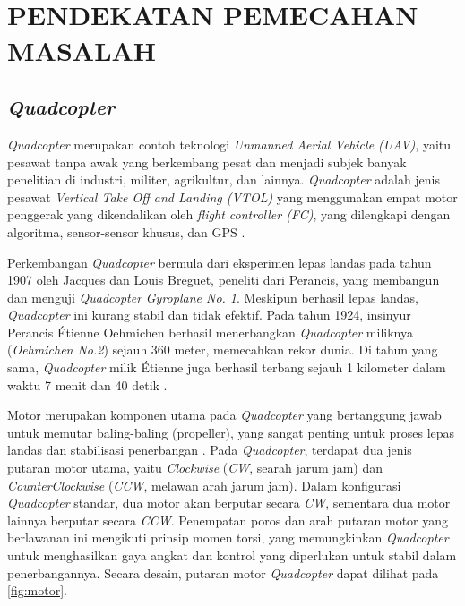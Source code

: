 
\chapter[PENDEKATAN PEMECAHAN MASALAH]{\\ PENDEKATAN PEMECAHAN MASALAH}

\section{\textit{Quadcopter}}

\textit{Quadcopter} merupakan contoh teknologi \textit{Unmanned Aerial Vehicle (UAV)}, yaitu pesawat tanpa awak yang berkembang pesat dan menjadi subjek banyak penelitian di industri, militer, agrikultur, dan lainnya. \textit{Quadcopter} adalah jenis pesawat \textit{Vertical Take Off and Landing (VTOL)} yang menggunakan empat motor penggerak yang dikendalikan oleh \textit{flight controller (FC)}, yang dilengkapi dengan algoritma, sensor-sensor khusus, dan GPS \citep{devianto2017sistem}. 

Perkembangan \textit{Quadcopter} bermula dari eksperimen lepas landas pada tahun 1907 oleh Jacques dan Louis Breguet, peneliti dari Perancis, yang membangun dan menguji \textit{Quadcopter} \textit{Gyroplane No. 1}. Meskipun berhasil lepas landas, \textit{Quadcopter} ini kurang stabil dan tidak efektif. Pada tahun 1924, insinyur Perancis Étienne Oehmichen berhasil menerbangkan \textit{Quadcopter} miliknya (\textit{Oehmichen No.2}) sejauh 360 meter, memecahkan rekor dunia. Di tahun yang sama, \textit{Quadcopter} milik Étienne juga berhasil terbang sejauh 1 kilometer dalam waktu 7 menit dan 40 detik \citep{aerospace}.

Motor merupakan komponen utama pada \textit{Quadcopter} yang bertanggung jawab untuk memutar baling-baling (propeller), yang sangat penting untuk proses lepas landas dan stabilisasi penerbangan \citep{zuhri2023penerapan}. Pada \textit{Quadcopter}, terdapat dua jenis putaran motor utama, yaitu \textit{Clockwise} (\textit{CW}, searah jarum jam) dan \textit{CounterClockwise} (\textit{CCW}, melawan arah jarum jam). Dalam konfigurasi \textit{Quadcopter} standar, dua motor akan berputar secara \textit{CW}, sementara dua motor lainnya berputar secara \textit{CCW}. Penempatan poros dan arah putaran motor yang berlawanan ini mengikuti prinsip momen torsi, yang memungkinkan \textit{Quadcopter} untuk menghasilkan gaya angkat dan kontrol yang diperlukan untuk stabil dalam penerbangannya. Secara desain, putaran motor \textit{Quadcopter} dapat dilihat pada \cref{fig:motor}.


